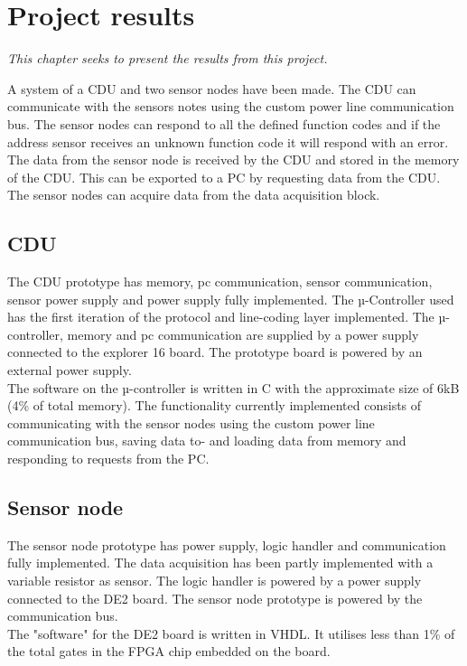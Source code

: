\chapter{Project results}
\textit{This chapter seeks to present the results from this project.}

A system of a CDU and two sensor nodes have been made. The CDU can communicate with the sensors notes using the custom power line communication bus. The sensor nodes can respond to all the defined function codes and if the address sensor receives an unknown function code it will respond with an error.\\
The data from the sensor node is received by the CDU and stored in the memory of the CDU. This can be exported to a PC by requesting data from the CDU.\\
The sensor nodes can acquire data from the data acquisition block.
\section{CDU}
The CDU prototype has memory, pc communication, sensor communication, sensor power supply and power supply fully implemented. The µ-Controller used has the first iteration of the protocol and line-coding layer implemented. The µ-controller, memory and pc communication are supplied by a power supply connected to the explorer 16 board. The prototype board is powered by an external power supply.\\
The software on the µ-controller is written in C with the approximate size of 6kB (4\% of total memory). The functionality currently implemented consists of communicating with the sensor nodes using the custom power line communication bus, saving data to- and loading data from memory and responding to requests from the PC.

\section{Sensor node}
The sensor node prototype has power supply, logic handler and communication fully implemented. The data acquisition has been partly implemented with a variable resistor as sensor. The logic handler is powered by a power supply connected to the DE2 board. The sensor node prototype is powered by the communication bus.\\
The "software" for the DE2 board is written in VHDL. It utilises less than 1\% of the total gates in the FPGA chip embedded on the board.

